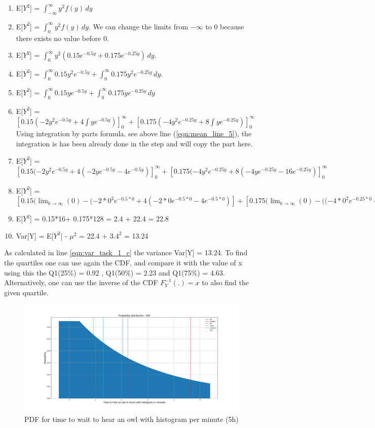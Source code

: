 \begin{enumerate}
    \item E[$Y^2$] = $\int_{-\infty}^{\infty}y^2f(y)\,dy$
    \item E[$Y^2$] = $\int_{0}^{\infty} y^2f(y)\,dy$.  We can change the limits from $-\infty$ to 0 because there exists no value before 0.
    \item E[$Y^2$] = $\int_{0}^{\infty} y^2(0.15e^{-0.5y} + 0.175e^{-0.25y})\,dy$.
    \item E[$Y^2$] = $\int_{0}^{\infty} 0.15y^2e^{-0.5y} + \int_{0}^{\infty} 0.175y^2e^{-0.25y}\,dy$.
    \item E[$Y^2$] = $\int_{0}^{\infty} 0.15ye^{-0.5y} + \int_{0}^{\infty} 0.175ye^{-0.25y}\,dy$
    \item E[$Y^2$] = $[0.15(-2y^2e^{-0.5y}+4\int ye^{-0.5y})]_0^\infty + [0.175(-4y^2e^{-0.25y}+8\int ye^{-0.25y})]_0^\infty$ Using integration by parts formula. see above line (\ref{eqn:mean_line_5}), the integration is has been already done in the step and will copy the part here.
    \item E[$Y^2$] = $[0.15(-2y^2e^{-0.5y} +4(-2ye^{-0.5y}-4e^{-0.5y})]_0^\infty + [0.175(-4y^2e^{-0.25y} +8(-4ye^{-0.25y}-16e^{-0.25y})]_0^\infty$
    \item E[$Y^2$] = $[0.15(\lim_{b\to\infty}(0)-(-2*0^2e^{-0.5*0} +4(-2*0e^{-0.5*0}-4e^{-0.5*0})] + [0.175(\lim_{b\to\infty}(0)-((-4*0^2e^{-0.25*0} +8(-4*0e^{-0.25*0}-16e^{-0.25*0})]$
    \item E[$Y^2$] = 0.15*16+ 0.175*128 = 2.4 + 22.4 = 22.8
    \item Var[Y] = E[$Y^2$] - $\mu^2$ = 22.4 + $3.4^2$ = 13.24 \label{eqn:var_task_1_c}
\end{enumerate}

As calculated in line \ref{eqn:var_task_1_c} the variance Var[Y] = 13.24. To find the quartiles one can use again the CDF, and compare it with the value of x using this the Q1(25\%) = 0.92 , Q1(50\%) = 2.23 and Q1(75\%) = 4.63. Alternatively, one can use the inverse of the CDF $F_{Y}^{-1} (.)=x$ to also find the given quartile.

\begin{figure}[h!]
\centering
\includegraphics[width=\textwidth]{pics/task_1_c_pdf.pdf}
\caption{PDF for time to wait to hear an owl with histogram per minute (5h)}\label{fig:task_1_c}
\end{figure}
\FloatBarrier    


